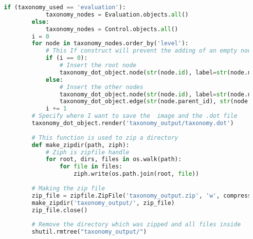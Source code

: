 \begin{itemize}
\begin{lstlisting}[language=Python, label=lst:view_DOT_eval, caption={Codice utilizzato per la realizzazione del
        file .dot e relativa immagine .}]
        if (taxonomy_used == 'evaluation'):
            taxonomy_nodes = Evaluation.objects.all()
        else:
            taxonomy_nodes = Control.objects.all()
        i = 0
        for node in taxonomy_nodes.order_by('level'):
            # This If construct will prevent the adding of an empty node to the root node in the graph
            if (i == 0):
                # Insert the root node
                taxonomy_dot_object.node(str(node.id), label=str(node.name))
            else:
                # Insert the other nodes
                taxonomy_dot_object.node(str(node.id), label=str(node.name))
                taxonomy_dot_object.edge(str(node.parent_id), str(node.id))
            i += 1
        # Specify where I want to save the  image and the .dot file
        taxonomy_dot_object.render('taxonomy_output/taxonomy.dot')
 
        # This function is used to zip a directory
        def make_zipdir(path, ziph):
            # Ziph is zipfile handle
            for root, dirs, files in os.walk(path):
                for file in files:
                    ziph.write(os.path.join(root, file))
 
        # Making the zip file
        zip_file = zipfile.ZipFile('taxonomy_output.zip', 'w', compression=zipfile.ZIP_DEFLATED)
        make_zipdir('taxonomy_output/', zip_file)
        zip_file.close()
 
        # Remove the directory which was zipped and all files inside
        shutil.rmtree("taxonomy_output/")
 

\end{lstlisting}
\end{itemize}
